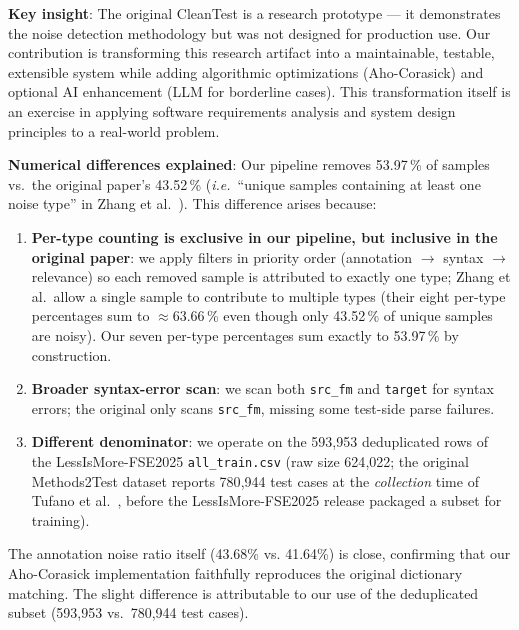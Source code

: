 \documentclass[acmlarge,nonacm,screen]{acmart}
\begin{document}
\textbf{Key insight}: The original CleanTest is a research prototype --- it demonstrates the noise detection methodology but was not designed for production use. Our contribution is transforming this research artifact into a maintainable, testable, extensible system while adding algorithmic optimizations (Aho-Corasick) and optional AI enhancement (LLM for borderline cases). This transformation itself is an exercise in applying software requirements analysis and system design principles to a real-world problem.

\textbf{Numerical differences explained}: Our pipeline removes
53.97\,\% of samples vs.\ the original paper's 43.52\,\%
(\emph{i.e.}\ ``unique samples containing at least one noise type''
in Zhang et al.~\cite{zhang2025cleantest}). This difference arises
because:
\begin{enumerate}
    \item \textbf{Per-type counting is exclusive in our pipeline,
        but inclusive in the original paper}: we apply filters in
        priority order (annotation $\to$ syntax $\to$ relevance) so
        each removed sample is attributed to exactly one type;
        Zhang et al.\ allow a single sample to contribute to multiple
        types (their eight per-type percentages sum to
        $\approx 63.66$\,\% even though only 43.52\,\% of unique
        samples are noisy). Our seven per-type percentages sum
        exactly to 53.97\,\% by construction.
    \item \textbf{Broader syntax-error scan}: we scan both
        \texttt{src\_fm} and \texttt{target} for syntax errors; the
        original only scans \texttt{src\_fm}, missing some test-side
        parse failures.
    \item \textbf{Different denominator}: we operate on the 593{,}953
        deduplicated rows of the LessIsMore-FSE2025
        \texttt{all\_train.csv} (raw size 624{,}022; the original
        Methods2Test dataset reports 780{,}944 test cases at the
        \emph{collection} time of Tufano et al.~\cite{tufano2022methods2test},
        before the LessIsMore-FSE2025 release packaged a subset for
        training).
\end{enumerate}

The annotation noise ratio itself (43.68\% vs. 41.64\%) is close, confirming that our Aho-Corasick implementation faithfully reproduces the original dictionary matching. The slight difference is attributable to our use of the deduplicated subset (593,953 vs.\ 780,944 test cases).
\end{document}

